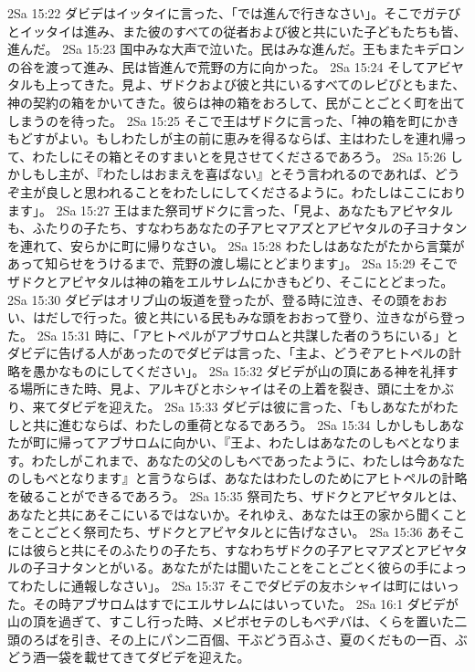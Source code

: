2Sa 15:22  ダビデはイッタイに言った、「では進んで行きなさい」。そこでガテびとイッタイは進み、また彼のすべての従者および彼と共にいた子どもたちも皆、進んだ。
2Sa 15:23  国中みな大声で泣いた。民はみな進んだ。王もまたキデロンの谷を渡って進み、民は皆進んで荒野の方に向かった。
2Sa 15:24  そしてアビヤタルも上ってきた。見よ、ザドクおよび彼と共にいるすべてのレビびともまた、神の契約の箱をかいてきた。彼らは神の箱をおろして、民がことごとく町を出てしまうのを待った。
2Sa 15:25  そこで王はザドクに言った、「神の箱を町にかきもどすがよい。もしわたしが主の前に恵みを得るならば、主はわたしを連れ帰って、わたしにその箱とそのすまいとを見させてくださるであろう。
2Sa 15:26  しかしもし主が、『わたしはおまえを喜ばない』とそう言われるのであれば、どうぞ主が良しと思われることをわたしにしてくださるように。わたしはここにおります」。
2Sa 15:27  王はまた祭司ザドクに言った、「見よ、あなたもアビヤタルも、ふたりの子たち、すなわちあなたの子アヒマアズとアビヤタルの子ヨナタンを連れて、安らかに町に帰りなさい。
2Sa 15:28  わたしはあなたがたから言葉があって知らせをうけるまで、荒野の渡し場にとどまります」。
2Sa 15:29  そこでザドクとアビヤタルは神の箱をエルサレムにかきもどり、そこにとどまった。
2Sa 15:30  ダビデはオリブ山の坂道を登ったが、登る時に泣き、その頭をおおい、はだしで行った。彼と共にいる民もみな頭をおおって登り、泣きながら登った。
2Sa 15:31  時に、「アヒトペルがアブサロムと共謀した者のうちにいる」とダビデに告げる人があったのでダビデは言った、「主よ、どうぞアヒトペルの計略を愚かなものにしてください」。
2Sa 15:32  ダビデが山の頂にある神を礼拝する場所にきた時、見よ、アルキびとホシャイはその上着を裂き、頭に土をかぶり、来てダビデを迎えた。
2Sa 15:33  ダビデは彼に言った、「もしあなたがわたしと共に進むならば、わたしの重荷となるであろう。
2Sa 15:34  しかしもしあなたが町に帰ってアブサロムに向かい、『王よ、わたしはあなたのしもべとなります。わたしがこれまで、あなたの父のしもべであったように、わたしは今あなたのしもべとなります』と言うならば、あなたはわたしのためにアヒトペルの計略を破ることができるであろう。
2Sa 15:35  祭司たち、ザドクとアビヤタルとは、あなたと共にあそこにいるではないか。それゆえ、あなたは王の家から聞くことをことごとく祭司たち、ザドクとアビヤタルとに告げなさい。
2Sa 15:36  あそこには彼らと共にそのふたりの子たち、すなわちザドクの子アヒマアズとアビヤタルの子ヨナタンとがいる。あなたがたは聞いたことをことごとく彼らの手によってわたしに通報しなさい」。
2Sa 15:37  そこでダビデの友ホシャイは町にはいった。その時アブサロムはすでにエルサレムにはいっていた。
2Sa 16:1  ダビデが山の頂を過ぎて、すこし行った時、メピボセテのしもべヂバは、くらを置いた二頭のろばを引き、その上にパン二百個、干ぶどう百ふさ、夏のくだもの一百、ぶどう酒一袋を載せてきてダビデを迎えた。
